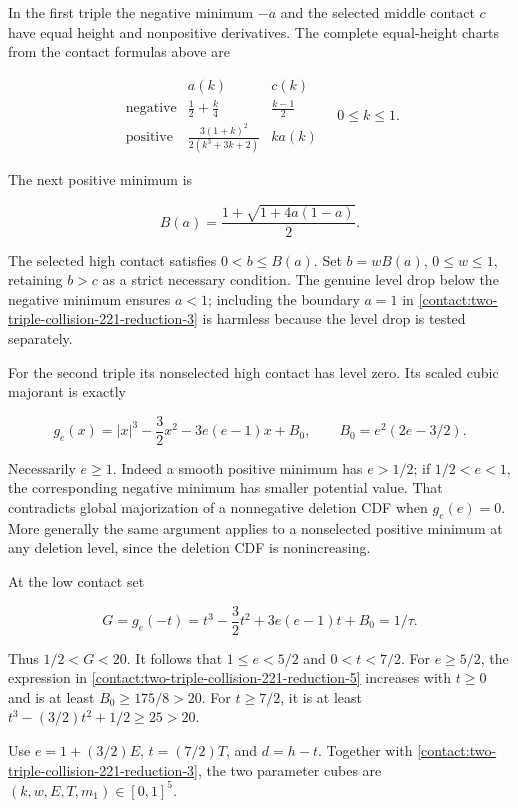 In the first triple the negative minimum $-a$ and the selected middle contact
$c$ have equal height and nonpositive derivatives. The complete equal-height
charts from the contact formulas above are

\[
 \begin{array}{c|c|c}
 &a(k)&c(k)\\ \hline
 \text{negative}&\frac12+\frac{k}{4}&\frac{k-1}{2}\\[2mm]
 \text{positive}&\frac{3(1+k)^2}{2(k^3+3k+2)}&k a(k)
 \end{array}
 \quad 0\leq k\leq1.
\tag{B.31.3}\label{contact:two-triple-collision-221-reduction-3}
\]

The next positive minimum is

\[
 B(a)=\frac{1+\sqrt{1+4a(1-a)}}2.
\]

The selected high contact satisfies $0<b\le B(a)$. Set $b=wB(a)$,
$0\le w\le 1$, retaining $b>c$ as a strict necessary condition. The genuine
level drop below the negative minimum ensures $a<1$; including the boundary
$a=1$ in \eqref{contact:two-triple-collision-221-reduction-3} is harmless because the level drop is tested separately.

For the second triple its nonselected high contact has level zero. Its scaled
cubic majorant is exactly

\[
 g_e(x)=|x|^3-\frac32x^2-3e(e-1)x+B_0,
 \qquad B_0=e^2(2e-3/2).
\tag{B.31.4}\label{contact:two-triple-collision-221-reduction-4}
\]

Necessarily $e\ge 1$. Indeed a smooth positive minimum has $e>1/2$; if
$1/2<e<1$, the corresponding negative minimum has smaller potential value.
That contradicts global majorization of a nonnegative deletion CDF when
$g_e(e)=0$. More generally the same argument applies to a nonselected positive
minimum at any deletion level, since the deletion CDF is nonincreasing.

At the low contact set

\[
 G=g_e(-t)=t^3-\frac32t^2+3e(e-1)t+B_0=1/\tau.
\tag{B.31.5}\label{contact:two-triple-collision-221-reduction-5}
\]

Thus $1/2<G<20$. It follows that $1\le e<5/2$ and $0<t<7/2$.
For $e\ge 5/2$, the expression in \eqref{contact:two-triple-collision-221-reduction-5} increases with $t\ge 0$ and is at
least $B_0\ge 175/8>20$. For $t\ge 7/2$, it is at least
$t^3-(3/2)t^2+1/2\ge 25>20$.

Use $e=1+(3/2)E$, $t=(7/2)T$, and $d=h-t$. Together with \eqref{contact:two-triple-collision-221-reduction-3}, the
two parameter cubes are $(k,w,E,T,m_1) \in [0,1]^5$.

